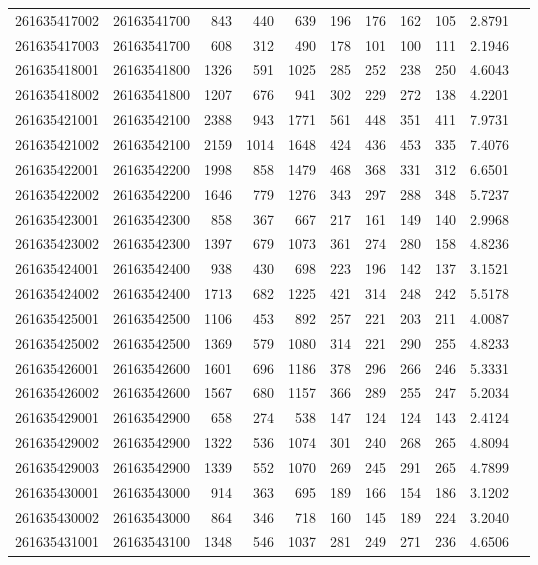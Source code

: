 \documentclass[11pt,landscape]{article}
\begin{document}
{\begin{longtable}[]{@{}lrrrrrrrrrr@{}}
261635417002 & 26163541700 & 843 & 440 & 639 & 196 & 176 & 162 & 105 & 2.8791 \\
261635417003 & 26163541700 & 608 & 312 & 490 & 178 & 101 & 100 & 111 & 2.1946 \\
261635418001 & 26163541800 & 1326 & 591 & 1025 & 285 & 252 & 238 & 250 & 4.6043 \\
261635418002 & 26163541800 & 1207 & 676 & 941 & 302 & 229 & 272 & 138 & 4.2201 \\
261635421001 & 26163542100 & 2388 & 943 & 1771 & 561 & 448 & 351 & 411 & 7.9731 \\
261635421002 & 26163542100 & 2159 & 1014 & 1648 & 424 & 436 & 453 & 335 & 7.4076 \\
261635422001 & 26163542200 & 1998 & 858 & 1479 & 468 & 368 & 331 & 312 & 6.6501 \\
261635422002 & 26163542200 & 1646 & 779 & 1276 & 343 & 297 & 288 & 348 & 5.7237 \\
261635423001 & 26163542300 & 858 & 367 & 667 & 217 & 161 & 149 & 140 & 2.9968 \\
261635423002 & 26163542300 & 1397 & 679 & 1073 & 361 & 274 & 280 & 158 & 4.8236 \\
261635424001 & 26163542400 & 938 & 430 & 698 & 223 & 196 & 142 & 137 & 3.1521 \\
261635424002 & 26163542400 & 1713 & 682 & 1225 & 421 & 314 & 248 & 242 & 5.5178 \\
261635425001 & 26163542500 & 1106 & 453 & 892 & 257 & 221 & 203 & 211 & 4.0087 \\
261635425002 & 26163542500 & 1369 & 579 & 1080 & 314 & 221 & 290 & 255 & 4.8233 \\
261635426001 & 26163542600 & 1601 & 696 & 1186 & 378 & 296 & 266 & 246 & 5.3331 \\
261635426002 & 26163542600 & 1567 & 680 & 1157 & 366 & 289 & 255 & 247 & 5.2034 \\
261635429001 & 26163542900 & 658 & 274 & 538 & 147 & 124 & 124 & 143 & 2.4124 \\
261635429002 & 26163542900 & 1322 & 536 & 1074 & 301 & 240 & 268 & 265 & 4.8094 \\
261635429003 & 26163542900 & 1339 & 552 & 1070 & 269 & 245 & 291 & 265 & 4.7899 \\
261635430001 & 26163543000 & 914 & 363 & 695 & 189 & 166 & 154 & 186 & 3.1202 \\
261635430002 & 26163543000 & 864 & 346 & 718 & 160 & 145 & 189 & 224 & 3.2040 \\
261635431001 & 26163543100 & 1348 & 546 & 1037 & 281 & 249 & 271 & 236 & 4.6506 \\

\end{longtable}}
\end{document}
